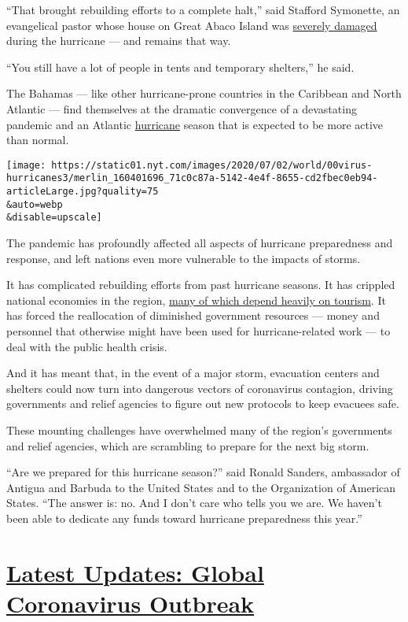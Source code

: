 ``That brought rebuilding efforts to a complete halt,'' said Stafford
Symonette, an evangelical pastor whose house on Great Abaco Island was
\href{https://www.nytimes.com/2019/09/06/world/americas/bahamas-abaco-hurricane-damage.html}{severely
damaged} during the hurricane --- and remains that way.

``You still have a lot of people in tents and temporary shelters,'' he
said.

The Bahamas --- like other hurricane-prone countries in the Caribbean
and North Atlantic --- find themselves at the dramatic convergence of a
devastating pandemic and an Atlantic
\href{https://www.nytimes.com/interactive/2020/07/25/us/hurricane-hanna-tracker-map.html}{hurricane}
season that is expected to be more active than normal.

\texttt{[image: https://static01.nyt.com/images/2020/07/02/world/00virus-hurricanes3/merlin\_160401696\_71c0c87a-5142-4e4f-8655-cd2fbec0eb94-articleLarge.jpg?quality=75\\\&auto=webp\\\&disable=upscale]}

The pandemic has profoundly affected all aspects of hurricane
preparedness and response, and left nations even more vulnerable to the
impacts of storms.

It has complicated rebuilding efforts from past hurricane seasons. It
has crippled national economies in the region,
\href{https://www.nytimes.com/2020/04/02/world/americas/virus-tourism-caribbean.html}{many
of which depend heavily on tourism}. It has forced the reallocation of
diminished government resources --- money and personnel that otherwise
might have been used for hurricane-related work --- to deal with the
public health crisis.

And it has meant that, in the event of a major storm, evacuation centers
and shelters could now turn into dangerous vectors of coronavirus
contagion, driving governments and relief agencies to figure out new
protocols to keep evacuees safe.

These mounting challenges have overwhelmed many of the region's
governments and relief agencies, which are scrambling to prepare for the
next big storm.

``Are we prepared for this hurricane season?'' said Ronald Sanders,
ambassador of Antigua and Barbuda to the United States and to the
Organization of American States. ``The answer is: no. And I don't care
who tells you we are. We haven't been able to dedicate any funds toward
hurricane preparedness this year.''

\hypertarget{latest-updates-global-coronavirus-outbreak}{%
\section{\texorpdfstring{\href{https://www.nytimes.com/2020/08/01/world/coronavirus-covid-19.html?action=click\&pgtype=Article\&state=default\&region=MAIN_CONTENT_1\&context=storylines_live_updates}{Latest
Updates: Global Coronavirus
Outbreak}}{Latest Updates: Global Coronavirus Outbreak}}\label{latest-updates-global-coronavirus-outbreak}}

